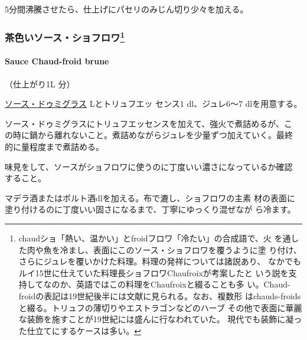 \begin{recette}
5分間沸騰させたら、仕上げにパセリのみじん切り少々を加える。

\maeaki

\hypertarget{ux8336ux8272ux3044ux30bdux30fcux30b9ux30b7ux30e7ux30d5ux30edux30ef15}{%
\subsubsection[茶色いソース・ショフロワ]{\texorpdfstring{茶色いソース・ショフロワ\footnote{chaudショ「熱い、温かい」とfroidフロワ「冷たい」の合成語で、火
  を通した肉や魚を冷まし、表面にこのソース・ショフロワを覆うように塗
  り付け、さらにジュレを覆いかけた料理。料理の発祥については諸説あり、
  なかでもルイ15世に仕えていた料理長ショフロワChaufroixが考案したと
  いう説を支持してなのか、英語ではこの料理をChaufroixと綴ることも多
  い。Chaud-froidの表記は19世紀後半には文献に見られる。なお、複数形
  はchauds-froidsと綴る。トリュフの薄切りやエストラゴンなどのハーブ
  その他で表面に華麗な装飾を施すことが19世紀には盛んに行なわれていた。
  現代でも装飾に凝った仕立てにするケースは多い。}}{茶色いソース・ショフロワ}}\label{ux8336ux8272ux3044ux30bdux30fcux30b9ux30b7ux30e7ux30d5ux30edux30ef15}}

\hypertarget{sauce-chaud-froid-brune}{%
\paragraph{Sauce Chaud-froid brune}\label{sauce-chaud-froid-brune}}


（仕上がり1L 分）

\protect\hyperlink{sauce-demi-glace}{ソース・ドゥミグラス}\troisquarts{}
Lとトリュフエッ センス1 dl、ジュレ6〜7 dlを用意する。

ソース・ドゥミグラスにトリュフエッセンスを加えて、強火で煮詰めるが、こ
の時に鍋から離れないこと。煮詰めながらジュレを少量ずつ加えていく。最終
的に\deuxtiers{}量程度まで煮詰める。

味見をして、ソースがショフロワに使うのに丁度いい濃さになっているか確認
すること。

マデラ酒またはポルト酒\undemi{}dlを加える。布で漉し、ショフロワの主素
材の表面に塗り付けるのに丁度いい固さになるまで、丁寧にゆっくり混ぜなが
ら冷ます。

\maeaki


\end{recette}
